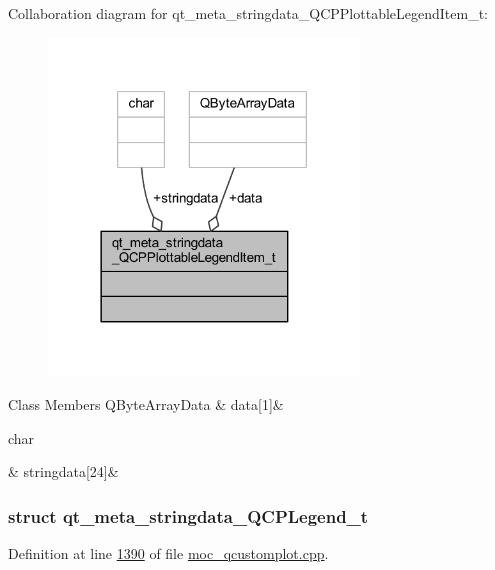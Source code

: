 Collaboration diagram for qt\+\_\+meta\+\_\+stringdata\+\_\+\+Q\+C\+P\+Plottable\+Legend\+Item\+\_\+t\+:
\nopagebreak
\begin{figure}[H]
\begin{center}
\leavevmode
\includegraphics[width=234pt]{dc/d52/a00183}
\end{center}
\end{figure}
\begin{DoxyFields}{Class Members}
\hypertarget{a00016_a56d928faacdea012d9b501b879ef98a8}{Q\+Byte\+Array\+Data}\label{a00016_a56d928faacdea012d9b501b879ef98a8}
&
data\mbox{[}1\mbox{]}&
\\
\hline

\hypertarget{a00016_a25e998eb002b6a9f9e969afa5247748f}{char}\label{a00016_a25e998eb002b6a9f9e969afa5247748f}
&
stringdata\mbox{[}24\mbox{]}&
\\
\hline

\end{DoxyFields}
\label{d2/da3/a00115}
\hypertarget{a00016_d2/da3/a00115}{}
\subsubsection{struct qt\+\_\+meta\+\_\+stringdata\+\_\+\+Q\+C\+P\+Legend\+\_\+t}


Definition at line \hyperlink{a00016_source_l01390}{1390} of file \hyperlink{a00016_source}{moc\+\_\+qcustomplot.\+cpp}.



